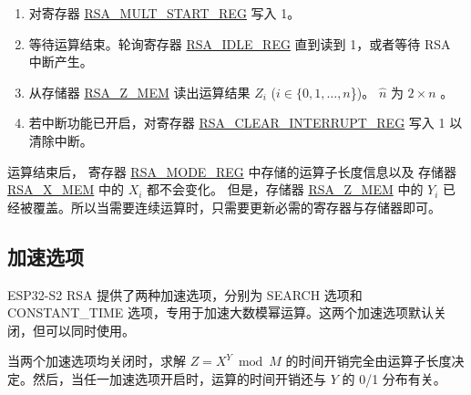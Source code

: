 \documentclass[main\_\_CN.tex]{subfiles}
\begin{document}
\begin{enumerate}
        只需要根据运算子长度，将这两个运算子中有效的数据写入存储器，没有使用到的存储器可以是任意值。

    \item 对寄存器 \hyperref[regdesc:RSAMULTSTARTREG]{RSA\_MULT\_START\_REG} 写入 1。

    \item 等待运算结束。轮询寄存器 \hyperref[regdesc:RSAIDLEREG]{RSA\_IDLE\_REG} 直到读到 1，或者等待 RSA 中断产生。

    \item 从存储器 \hyperref[regdesc:RSAmemory]{RSA\_Z\_MEM} 读出运算结果 \begin{math}Z_{i}\end{math} (\begin{math}i \in \{ 0, 1, \dots, n \end{math}\})。
        \begin{math}\hat{n}\end{math} 为  \begin{math} 2 \times n \end{math} 。

    \item 若中断功能已开启，对寄存器 \hyperref[regdesc:RSACLEARINTERRUPTREG]{RSA\_CLEAR\_INTERRUPT\_REG} 写入 1 以清除中断。

\end{enumerate}

运算结束后，
寄存器 \hyperref[regdesc:RSAMODEREG]{RSA\_MODE\_REG} 中存储的运算子长度信息以及
存储器 \hyperref[regdesc:RSAmemory]{RSA\_X\_MEM} 中的 \begin{math}{X}_{i}\end{math} 都不会变化。
但是，存储器 \hyperref[regdesc:RSAmemory]{RSA\_Z\_MEM} 中的 \begin{math}{Y}_{i}\end{math}
已经被覆盖。所以当需要连续运算时，只需要更新必需的寄存器与存储器即可。

\subsection{加速选项} \label{Label Accelerate options}

ESP32-S2 RSA 提供了两种加速选项，分别为 SEARCH 选项和 CONSTANT\_TIME 选项，专用于加速大数模幂运算。这两个加速选项默认关闭，但可以同时使用。

当两个加速选项均关闭时，求解 \begin{math}Z = X^{Y} \bmod M\end{math} 的时间开销完全由运算子长度决定。然后，当任一加速选项开启时，运算的时间开销还与 \begin{math}Y\end{math} 的 0/1 分布有关。
\end{document}
